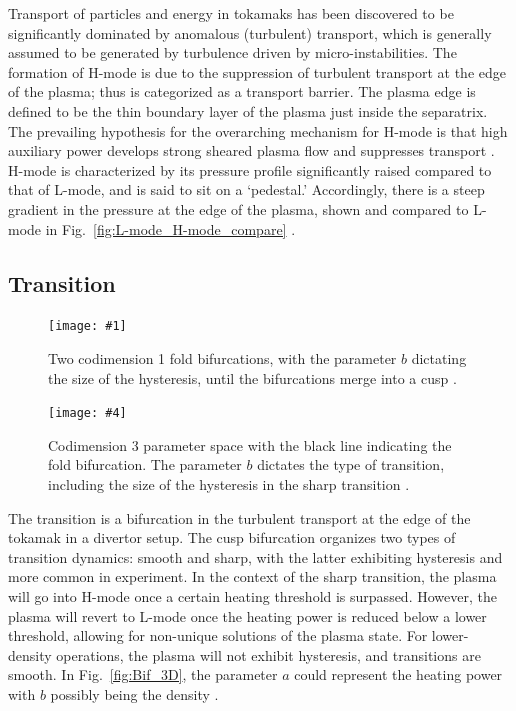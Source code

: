 \documentclass[a4paper]{article}
\newcommand\TwoFig[6]{%
	\sbox\IBoxA{\texttt{[image: \#1]}}
	\sbox\IBoxB{\texttt{[image: \#4]}}%
	\ifdim\ht\IBoxA>\ht\IBoxB
		\setlength\IHeight{\ht\IBoxB}%
	\else\setlength\IHeight{\ht\IBoxA}\fi
	\begin{figure}[tb]
		\minipage[t]{0.45\textwidth}\centering
			\texttt{[image: \#1]}
			\caption{#2}\label{#3}
		\endminipage\hfill
		\minipage[t]{0.45\textwidth}\centering
			\texttt{[image: \#4]}
			\caption{#5}\label{#6}
		\endminipage
	\end{figure}%
}
\begin{document}
Transport of particles and energy in tokamaks has been discovered to be significantly dominated by anomalous (turbulent) transport, which is generally assumed to be generated by turbulence driven by micro-instabilities.
The formation of H-mode is due to the suppression of turbulent transport at the edge of the plasma; thus is categorized as a transport barrier.
The plasma edge is defined to be the thin boundary layer of the plasma just inside the separatrix.
The prevailing hypothesis for the overarching mechanism for H-mode is that high auxiliary power develops strong sheared plasma flow and suppresses transport \cite{freidberg_plasma_2007}.
H-mode is characterized by its pressure profile significantly raised compared to that of L-mode, and is said to sit on a `pedestal.'
Accordingly, there is a steep gradient in the pressure at the edge of the plasma, shown and compared to L-mode in Fig.~\ref{fig:L-mode_H-mode_compare} \cite{weymiens_bifurcation_2014}.


\subsection{Transition}
\TwoFig{../../Graphics/Bif_Graphs/Bif_3D.png}
	{Two codimension 1 fold bifurcations, with the parameter $b$ dictating the size of the hysteresis, until the bifurcations merge into a cusp \cite{weymiens_bifurcation_2014}.}
	{fig:Bif_3D}
	{../../Graphics/Bif_Graphs/3_transitions_single_simple.png}
	{Codimension 3 parameter space with the black line indicating the fold bifurcation. The parameter $b$ dictates the type of transition, including the size of the hysteresis in the sharp transition \cite{weymiens_bifurcation_2014}.}
	{fig:Bif_types}

The transition is a bifurcation in the turbulent transport at the edge of the tokamak in a divertor setup.
The cusp bifurcation organizes two types of transition dynamics: smooth and sharp, with the latter exhibiting hysteresis and more common in experiment.
In the context of the sharp transition, the plasma will go into H-mode once a certain heating threshold is surpassed.
However, the plasma will revert to L-mode once the heating power is reduced below a lower threshold, allowing for non-unique solutions of the plasma state.
For lower-density operations, the plasma will not exhibit hysteresis, and transitions are smooth.
In Fig.~\ref{fig:Bif_3D}, the parameter $a$ could represent the heating power with $b$ possibly being the density \cite{weymiens_bifurcation_2014}.
\end{document}
